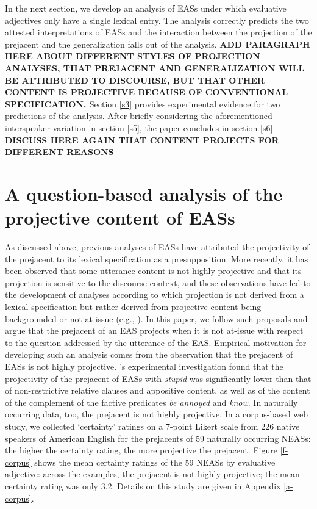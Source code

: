 \documentclass[11pt,fleqn]{article}
\newcommand{\6}{\mbox{$[\hspace*{-.6mm}[$}}
\newcommand{\9}{\mbox{$]\hspace*{-.6mm}]$}}
\newcommand{\citepos}[1]{\citeauthor{#1}'s \citeyear{#1}}
\begin{document}
In the next section, we develop an analysis of EASs under which evaluative adjectives only have a single lexical entry. The analysis correctly predicts the two attested interpretations of EASs and the  interaction between the projection of the prejacent and the generalization falls out of the analysis. {\bf ADD PARAGRAPH HERE ABOUT DIFFERENT STYLES OF PROJECTION ANALYSES, THAT PREJACENT AND GENERALIZATION WILL BE ATTRIBUTED TO DISCOURSE, BUT THAT OTHER CONTENT IS PROJECTIVE BECAUSE OF CONVENTIONAL SPECIFICATION. \citealt{kadmon01,brst-lang11,tonhauser-etal-sub23}} Section \ref{s3} provides experimental evidence for two predictions of the analysis. After briefly considering the aforementioned interspeaker variation in section \ref{s5}, the paper concludes in section \ref{s6} {\bf DISCUSS HERE AGAIN THAT CONTENT PROJECTS FOR DIFFERENT REASONS}

\section{A question-based analysis of the projective content of EASs}\label{s2}

As discussed above, previous analyses of EASs have attributed the projectivity of the prejacent to its lexical specification as a presupposition. More recently, it has been observed that some utterance content is not highly projective and that its projection is sensitive to the discourse context, and these observations have led to the development of analyses according to which projection is not derived from a lexical specification but rather derived from projective content being backgrounded or not-at-issue (e.g., \citealt{abrusan2011,abrusan2016,brst-salt10,best-question,brst-ar}). In this paper, we follow such proposals and argue that the prejacent of an EAS projects when it is not at-issue with respect to the question addressed by the utterance of the EAS. Empirical motivation for developing such an analysis comes from the observation that the prejacent of EASs is not highly projective.  \citepos{tbd-variability} experimental investigation found that the projectivity of the prejacent of EASs with {\em stupid} was significantly lower than that of non-restrictive relative clauses and appositive content, as well as of the content of the complement of the factive predicates {\em be annoyed} and {\em know}. In naturally occurring data, too, the prejacent is not highly projective. In a corpus-based web study, we collected `certainty' ratings on a 7-point Likert scale from 226 native speakers of American English for the prejacents of 59 naturally occurring NEASs: the higher the certainty rating, the more projective the prejacent. Figure \ref{f-corpus} shows the mean certainty ratings of the 59 NEASs by evaluative adjective: across the examples, the prejacent is not highly projective; the mean certainty rating was only 3.2. Details on this study are given in Appendix \ref{a-corpus}.
\end{document}
